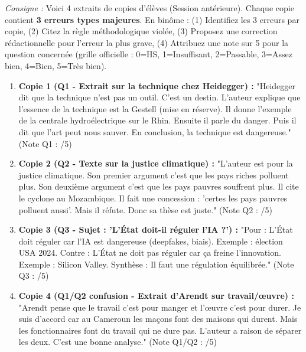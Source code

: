 \documentclass[11pt]{article}
\newcommand{\cle}[1]{{\popxbold\color{popdark}#1}}
\newcounter{popsec}
\newcounter{popsub}
\newcommand{\courssub}[1]{%
  \stepcounter{popsub}%
  \par\vspace{9pt}\noindent{\popxbold\fontsize{11.5}{13}\selectfont\color{popink}{\color{poporange}\thepopsec.\thepopsub}\hspace{6pt}#1}\par\nopagebreak\vspace{4pt}
}
\begin{document}
\begin{exercice}
\emph{Consigne :} Voici 4 extraits de copies d'élèves (Session antérieure). Chaque copie contient \textbf{3 erreurs types majeures}. En binôme : (1) Identifiez les 3 erreurs par copie, (2) Citez la règle méthodologique violée, (3) Proposez une correction rédactionnelle pour l'erreur la plus grave, (4) Attribuez une note sur 5 pour la question concernée (grille officielle : 0=HS, 1=Insuffisant, 2=Passable, 3=Assez bien, 4=Bien, 5=Très bien).

\begin{enumerate}
    \item \textbf{Copie 1 (Q1 - Extrait sur la technique chez Heidegger) :} "Heidegger dit que la technique n'est pas un outil. C'est un destin. L'auteur explique que l'essence de la technique est la \cle{Gestell} (mise en réserve). Il donne l'exemple de la centrale hydroélectrique sur le Rhin. Ensuite il parle du danger. Puis il dit que l'art peut nous sauver. En conclusion, la technique est dangereuse." \hfill (Note Q1 : /5)
    \item \textbf{Copie 2 (Q2 - Texte sur la justice climatique) :} "L'auteur est pour la justice climatique. Son premier argument c'est que les pays riches polluent plus. Son deuxième argument c'est que les pays pauvres souffrent plus. Il cite le cyclone au Mozambique. Il fait une concession : 'certes les pays pauvres polluent aussi'. Mais il réfute. Donc sa thèse est juste." \hfill (Note Q2 : /5)
    \item \textbf{Copie 3 (Q3 - Sujet : 'L'État doit-il réguler l'IA ?') :} "Pour : L'État doit réguler car l'IA est dangereuse (deepfakes, biais). Exemple : élection USA 2024. Contre : L'État ne doit pas réguler car ça freine l'innovation. Exemple : Silicon Valley. Synthèse : Il faut une régulation équilibrée." \hfill (Note Q3 : /5)
    \item \textbf{Copie 4 (Q1/Q2 confusion - Extrait d'Arendt sur travail/œuvre) :} "Arendt pense que le travail c'est pour manger et l'œuvre c'est pour durer. Je suis d'accord car au Cameroun les maçons font des maisons qui durent. Mais les fonctionnaires font du travail qui ne dure pas. L'auteur a raison de séparer les deux. C'est une bonne analyse." \hfill (Note Q1/Q2 : /5)
\end{enumerate}
\end{exercice}

\courssub{Je me prépare au Bac}
\end{document}
